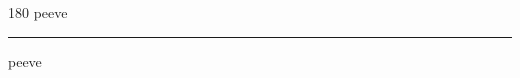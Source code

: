 
\begin{frame}
\begin{center}
\begin{turn}{180}
{\fontsize{2.5cm}{1em}\selectfont peeve}
\end{turn}
\vspace{1em}\par  
\hrule
\vspace{1em}\par  
{\fontsize{2.5cm}{1em}\selectfont peeve}
\end{center}
\end{frame}
